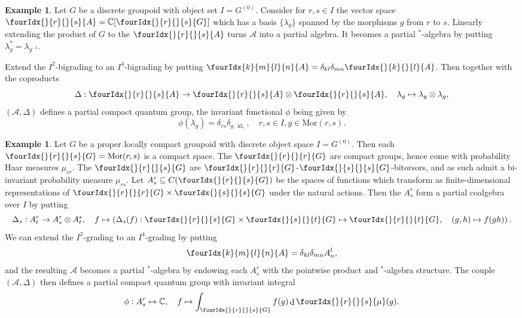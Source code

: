 \documentclass[10pt]{article}
\DeclareMathOperator{\id}{id}
\DeclareMathOperator{\rd}{\mathrm{d}}
\newcommand{\C}{\mathbb{C}}
\newcommand{\Mor}{\mathrm{Mor}}
\newcommand{\Gr}[5]{\fourIdx{#2}{#4}{#3}{#5}{#1}}%
\newcommand{\Gru}[3]{\Gr{#1}{}{}{#2}{#3}}
\theoremstyle{definition}
\newtheorem{Exa}[Theorem]{Example}
\numberwithin{equation}{section}
\begin{document}
\begin{Exa} Let $G$ be a discrete groupoid with object set $I = G^{(0)}$. Consider for $r,s\in I$ the vector space $\Gru{A}{r}{s}= \mathbb{C}\lbrack \Gru{G}{r}{s}\rbrack$ which has a basis $\{\lambda_g\}$ spanned by the morphisms $g$ from $r$ to $s$. Linearly extending the product of $G$ to the $\Gru{A}{r}{s}$ turns $\mathscr{A}$ into a partial algebra. It becomes a partial $^*$-algebra by putting $\lambda_g^* = \lambda_{g^{-1}}$. 

Extend the $I^2$-bigrading to an $I^4$-bigrading by putting $\Gr{A}{k}{l}{m}{n} = \delta_{kl}\delta_{mn}\Gru{A}{k}{l}$. Then together with the coproducts \[ \Delta: \Gru{A}{r}{s}\rightarrow \Gru{A}{r}{s}\otimes \Gru{A}{r}{s},\quad \lambda_g\mapsto \lambda_g\otimes \lambda_g,\] $(\mathscr{A},\Delta)$ defines a partial compact quantum group, the invariant functional $\phi$ being given by \[\phi(\lambda_g) = \delta_{rs}\delta_{g,\id_r},\quad r,s\in I,g\in \Mor(r,s).\]
\end{Exa}

\begin{Exa} Let $G$ be a proper locally compact groupoid with discrete object space $I=G^{(0)}$. Then each $\Gru{G}{r}{s} = \Mor(r,s)$ is a compact space. The $\Gru{G}{r}{r}$ are compact groups, hence come with probability Haar measures $\mu_{rr}$. The $\Gru{G}{r}{s}$ are $\Gru{G}{r}{r}$-$\Gru{G}{s}{s}$-bitorsors, and as such admit a bi-invariant probability measure $\mu_{rs}$. Let $A^r_s \subseteq C(\Gru{G}{r}{s})$ be the spaces of functions which transform as finite-dimensional representations of $\Gru{G}{r}{r}\times \Gru{G}{s}{s}$ under the natural actions. Then the $A^r_s$ form a partial coalgebra over $I$ by putting \[\Delta_{s}: A^r_t \rightarrow A^r_s\otimes A^s_t,\quad f\mapsto \left(\Delta_s(f):\Gru{G}{r}{s}\times \Gru{G}{s}{t}\mapsto \Gru{G}{r}{t},\quad (g,h)\mapsto f(gh)\right).\] We can extend the $I^2$-grading to an $I^4$-grading by putting \[\Gr{A}{k}{l}{m}{n} = \delta_{kl}\delta_{mn} A^l_n,\] and the resulting $\mathscr{A}$ becomes a partial $^*$-algebra by endowing each $A^r_s$ with the pointwise product and $^*$-algebra structure. The couple $(\mathscr{A},\Delta)$ then defines a partial compact quantum group with invariant integral \[\phi: A^r_s \mapsto \C,\quad f\mapsto \int_{\Gru{G}{r}{s}} f(g) \rd \Gru{\mu}{r}{s}(g).\]

\end{Exa}
\end{document}
